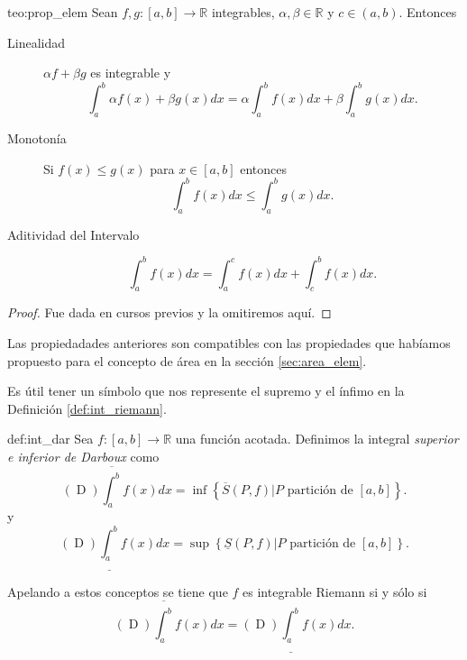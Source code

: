 \begin{teorema}{teo:prop_elem} Sean $f,g:[a,b]\to\mathbb{R}$ integrables, $\alpha,\beta\in\mathbb{R}$ y $c\in (a,b)$. Entonces
\begin{description}
 \item[Linealidad] $\alpha f+\beta g$ es integrable y 
 \[
  \int_a^b\alpha f(x)+\beta g(x)dx=\alpha \int_a^bf(x)dx+\beta\int_a^b g(x)dx.
 \]
 \item[Monotonía] Si $f(x)\leq g(x)$  para $x\in [a,b]$ entonces 
 \[
  \int_a^b f(x)dx\leq \int_a^b g(x)dx.
 \]
 \item[Aditividad del Intervalo]  \[
  \int_a^b  f(x)dx= \int_a^cf(x)dx+\int_c^b f(x)dx.
 \]
\end{description}


\end{teorema}

\begin{proof} Fue dada en cursos previos y la omitiremos aquí. 
\end{proof}


\begin{observa} Las propiedadades anteriores son compatibles con las propiedades que habíamos propuesto para el concepto de área en la sección  \ref{sec:area_elem}.
\end{observa}



Es útil tener un símbolo que nos represente el supremo y el ínfimo en la Definición \ref{def:int_riemann}.

\begin{definicion}{def:int_dar}
 Sea $f:[a,b]\to\mathbb{R}$ una función acotada. Definimos la integral \emph{superior e inferior de Darboux}  como
\begin{equation}\label{eq:darboux_sup}
 (\mathop{D})\overline{\int_a^b}f(x)dx=\inf\left\{\overline{S}(P,f)| P \text{ partición de }[a,b]\right\}.
 \end{equation}
y
\begin{equation}\label{eq:darboux_inf}
 (\mathop{D})\underline{\int_a^b}f(x)dx=\sup\left\{\underline{S}(P,f)| P \text{ partición de }[a,b]\right\}.
 \end{equation}
\end{definicion}

Apelando a estos conceptos se tiene que $f$ es integrable Riemann si y sólo si 
\begin{equation}\label{eq:darboux_riemann}
 (\mathop{D})\overline{\int_a^b}f(x)dx= (\mathop{D})\underline{\int_a^b}f(x)dx .
 \end{equation}

